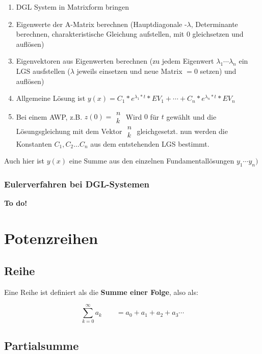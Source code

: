 \documentclass[12pt, a4paper]{scrreprt}
\begin{document}
\begin{enumerate}
\item DGL System in Matrixform bringen
\item Eigenwerte der A-Matrix berechnen (Hauptdiagonale -\(\lambda\), Determinante berechnen, charakteristische Gleichung aufstellen, mit 0 gleichsetzen und auflösen)
\item Eigenvektoren aus Eigenwerten berechnen (zu jedem Eigenwert \(\lambda_1\cdots\lambda_n\) ein LGS ausfstellen (\(\lambda\) jeweils einsetzen und neue Matrix \(=0\) setzen) und auflösen)
\item Allgemeine Lösung ist \(y(x)=C_1*e^{\lambda_1*t}*EV_1+\cdots+C_n*e^{\lambda_n*t}*EV_n\)
\item Bei einem AWP, z.B. \(z(0) =
  \begin{smallmatrix}
    n\\
    k
  \end{smallmatrix}
\) Wird \(0\) für \(t\) gewählt und die Lösungsgleichung mit dem Vektor \(
\begin{smallmatrix}
  n\\
  k
\end{smallmatrix}
\) gleichgesetzt. nun werden die Konstanten \(C_1, C_2 \dots C_n\) aus dem entstehenden LGS bestimmt.
\end{enumerate}
Auch hier ist \(y(x)\) eine Summe aus den einzelnen Fundamentallösungen \(y_1\cdots y_n)\)

\subsection{Eulerverfahren bei DGL-Systemen}
\textbf{To do!}

\setcounter{chapter}{9}
\chapter{Potenzreihen}

\section{Reihe}
Eine Reihe ist definiert als die \textbf{Summe einer Folge}, also als:

\[
  \sum_{k=0}^{\infty}a_k  \qquad =  a_0 + a_1 + a_2 + a_3 \cdots
\]

\section{Partialsumme}
\end{document}
